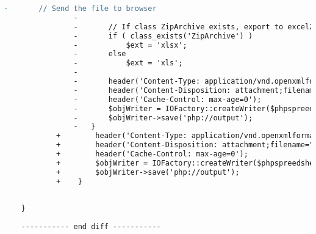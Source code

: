 \begin{lstlisting}[language=diff, caption=Perubahan pada kode Users.php]
				-		// Send the file to browser
				-
				-		// If class ZipArchive exists, export to excel2007, otherwise export to excel5
				-		if ( class_exists('ZipArchive') )
				-			$ext = 'xlsx';
				-		else
				-			$ext = 'xls';
				-
				-		header('Content-Type: application/vnd.openxmlformats-officedocument.spreadsheetml.sheet');
				-		header('Content-Disposition: attachment;filename="'.$output_filename.'.'.$ext.'"');
				-		header('Cache-Control: max-age=0');
				-		$objWriter = IOFactory::createWriter($phpspreedsheet, ucfirst($ext));
				-		$objWriter->save('php://output');
				-	}
			+        header('Content-Type: application/vnd.openxmlformats-officedocument.spreadsheetml.sheet');
			+        header('Content-Disposition: attachment;filename="'.$output_filename.'.'.$ext.'"');
			+        header('Cache-Control: max-age=0');
			+        $objWriter = IOFactory::createWriter($phpspreedsheet, ucfirst($ext));
			+        $objWriter->save('php://output');
			+    }
		
		
	}
	
	----------- end diff -----------
\end{lstlisting}


